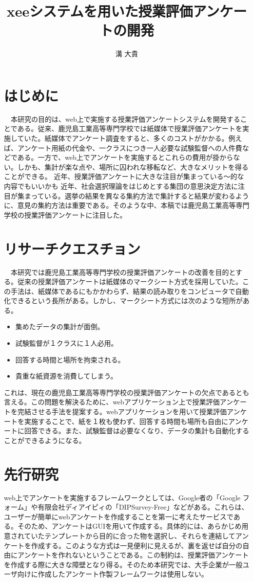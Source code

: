\documentclass[11pt,a4paper]{jsarticle}
\title{xeeシステムを用いた授業評価アンケートの開発}
\author{溝 大貴}
\begin{document}
\maketitle
%
%
\section{はじめに}
　本研究の目的は、web上で実施する授業評価アンケートシステムを開発することである。従来、鹿児島工業高等専門学校では紙媒体で授業評価アンケートを実施していた。紙媒体でアンケート調査をすると、多くのコストがかかる。例えば、アンケート用紙の代金や、一クラスにつき一人必要な試験監督への人件費などである。一方で、web上でアンケートを実施するとこれらの費用が掛からない。しかも、集計が楽な点や、場所に囚われな移転など、大きなメリットを得ることができる。
近年、授業評価アンケートに大きな注目が集まっている～的な内容でもいいかも
近年、社会選択理論をはじめとする集団の意思決定方法に注目が集まっている。選挙の結果を異なる集約方法で集計すると結果が変わるように、意見の集約方法は重要である。そのような中、本稿では鹿児島工業高等専門学校の授業評価アンケートに注目した。

\section{リサーチクエスチョン}
　本研究では鹿児島工業高等専門学校の授業評価アンケートの改善を目的とする。従来の授業評価アンケートは紙媒体のマークシート方式を採用していた。この手法は、紙媒体であるにもかかわらず、結果の読み取りをコンピュータで自動化できるという長所がある。しかし、マークシート方式には次のような短所がある。
\begin{itemize}
  \item 集めたデータの集計が面倒。 
  \item 試験監督が１クラスに１人必用。 
  \item 回答する時間と場所を拘束される。
  \item 貴重な紙資源を消費してしまう。
\end{itemize}
これは、現在の鹿児島工業高等専門学校の授業評価アンケートの欠点であるとも言える。この問題を解決るために、webアプリケーション上で授業評価アンケートを完結させる手法を提案する。webアプリケーションを用いて授業評価アンケートを実施することで、紙を１枚も使わず、回答する時間も場所も自由にアンケートに回答できる。また、試験監督は必要なくなり、データの集計も自動化することができるようになる。
\section{先行研究}
web上でアンケートを実施するフレームワークとしては、Google者の「Google フォーム」や有限会社ディアイピィの「DIPSurvey-Free」などがある。これらは、ユーザーが簡単にwebアンケートを作成することを第一に考えたサービスである。そのため、アンケートはGUIを用いて作成する。具体的には、あらかじめ用意されていたテンプレートから目的に合った物を選択し、それらを連結してアンケートを作成する。このような方式は一見便利に見えるが、裏を返せば自分の自由にアンケートを作れないということである。この制約は、授業評価アンケートを作成する際に大きな障壁となり得る。そのため本研究では、大手企業が一般ユーザ向けに作成したアンケート作製フレームワークは使用しない。
\end{document}
